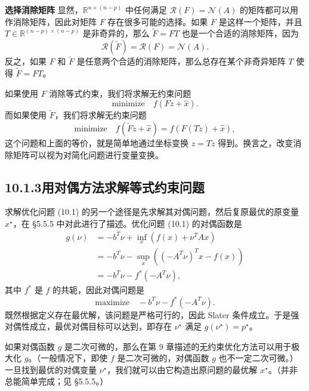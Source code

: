 \documentclass[UTF8, 12pt, fontset=fandol, oneside]{ctexart}
\begin{document}
\noindent\textbf{选择消除矩阵}\quad
显然，$\mathbb{R}^{n\times(n-p)}$ 中任何满足 $\mathcal{R}(F)=\mathcal{N}(A)$ 的矩阵都可以用作消除矩阵，因此对矩阵 $F$ 存在很多可能的选择。如果 $F$ 是这样一个矩阵，并且 $T\in\mathbb{R}^{(n-p)\times(n-p)}$ 是非奇异的，那么 $\tilde{F}=FT$ 也是一个合适的消除矩阵，因为
\[
\mathcal{R}(\tilde{F})=\mathcal{R}(F)=\mathcal{N}(A).
\]
反之，如果 $F$ 和 $\tilde{F}$ 是任意两个合适的消除矩阵，那么总存在某个非奇异矩阵 $T$ 使得 $\tilde{F}=FT$。

如果使用 $F$ 消除等式约束，我们将求解无约束问题
\[
\text{minimize}\quad f(Fz+\hat{x}).
\]
而如果使用 $\tilde{F}$，我们将求解无约束问题
\[
\text{minimize}\quad f(\tilde{F}\tilde{z}+\hat{x})=f(F(T\tilde{z})+\hat{x}),
\]
这个问题和上面的等价，就是简单地通过坐标变换 $z=T\tilde{z}$ 得到。换言之，改变消除矩阵可以视为对简化问题进行变量变换。

\subsection*{10.1.3\quad 用对偶方法求解等式约束问题}

求解优化问题 (10.1) 的另一个途径是先求解其对偶问题，然后复原最优的原变量 $x^\star$，在 \S5.5.5 中对此进行了描述。优化问题 (10.1) 的对偶函数是
\[
\begin{aligned}
g(\nu)
&=-b^T\nu+\inf_x(f(x)+\nu^TAx)\\
&=-b^T\nu-\sup_x\left(( -A^T\nu)^Tx-f(x)\right)\\
&=-b^T\nu-f^\ast(-A^T\nu),
\end{aligned}
\]
其中 $f^\ast$ 是 $f$ 的共轭，因此对偶问题是
\[
\text{maximize}\quad -b^T\nu-f^\ast(-A^T\nu).
\]
既然根据定义存在最优解，该问题是严格可行的，因此 Slater 条件成立。于是强对偶性成立，最优对偶目标可以达到，即存在 $\nu^\star$ 满足 $g(\nu^\star)=p^\star$。

如果对偶函数 $g$ 是二次可微的，那么在第 9 章描述的无约束优化方法可以用于极大化 $g$。（一般情况下，即使 $f$ 是二次可微的，对偶函数 $g$ 也不一定二次可微。）一旦找到最优的对偶变量 $\nu^\star$，我们就可以由它构造出原问题的最优解 $x^\star$。（并非总能简单完成；见 \S5.5.5。）
\end{document}

